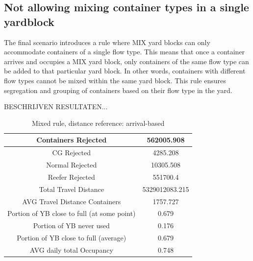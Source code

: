 \documentclass{article}
\begin{document}
\subsection{Not allowing mixing container types in a single yardblock}
The final scenario introduces a rule where MIX yard blocks can only accommodate
containers of a single flow type. This means that once a container arrives and
occupies a MIX yard block, only containers of the same flow type can be added
to that particular yard block. In other words, containers with different flow
types cannot be mixed within the same yard block. This rule ensures segregation
and grouping of containers based on their flow type in the yard.

BESCHRIJVEN RESULTATEN...

\begin{table}[h]
    \centering
    \begin{tabular}{|c|c|}
        \hline
        Containers Rejected                         & 562005.908     \\ \hline
        CG Rejected                                 & 4285.208       \\ \hline
        Normal Rejected                             & 10305.508      \\ \hline
        Reefer Rejected                             & 551700.4       \\ \hline
        Total Travel Distance                       & 5329012083.215 \\ \hline
        AVG Travel Distance Containers              & 1757.727       \\ \hline
        Portion of YB close to full (at some point) & 0.679          \\ \hline
        Portion of YB never used                    & 0.176          \\ \hline
        Portion of YB close to full (average)       & 0.679          \\ \hline
        AVG daily total Occupancy                   & 0.748          \\ \hline
    \end{tabular}
    \caption{Mixed rule, distance reference: arrival-based}
\end{table}
\end{document}
